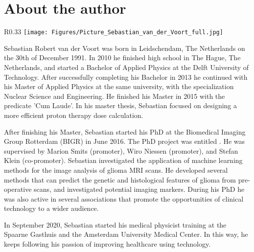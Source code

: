 \chapter{About the author}

\begin{wrapfigure}{R}{0.33\textwidth}
    \centering
    \texttt{[image: Figures/Picture\_Sebastian\_van\_der\_Voort\_full.jpg]}
\end{wrapfigure}


Sebastian Robert van der Voort was born in Leidschendam, The Netherlands on the 30th of December 1991.
In 2010 he finished high school in The Hague, The Netherlands, and started a Bachelor of Applied Physics at the Delft University of Technology.
After successfully completing his Bachelor in 2013 he continued with his Master of Applied Physics at the same university, with the specialization Nuclear Science and Engineering.
He finished his Master in 2015 with the predicate 'Cum Laude'.
In his master thesis, Sebastian focused on designing a more efficient proton therapy dose calculation.

\vspace{\baselineskip}
\noindent After finishing his Master, Sebastian started his PhD at the Biomedical Imaging Group Rotterdam (BIGR) in June 2016.
The PhD project was entitled .
He was supervised by Marion Smits (promoter), Wiro Niessen (promoter), and Stefan Klein (co-promoter).
Sebastian investigated the application of machine learning methods for the image analysis of glioma MRI scans.
He developed several methods that can predict the genetic and histological features of glioma from pre-operative scans, and investigated potential imaging markers.
During his PhD he was also active in several associations that promote the opportunities of clinical technology to a wider audience.

\vspace{\baselineskip}
\noindent In September 2020, Sebastian started his medical physicist training at the Spaarne Gasthuis and the Amsterdam University Medical Center.
In this way, he keeps following his passion of improving healthcare using technology.

